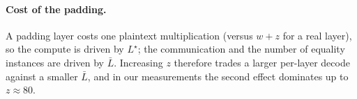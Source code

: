 \paragraph{Cost of the padding.}
A padding layer costs one plaintext multiplication (versus $w + z$ for a real
layer), so the compute is driven by $L^\star$; the communication and the number
of equality instances are driven by $\bar{L}$. Increasing $z$ therefore trades
a larger per-layer decode against a smaller $\bar{L}$, and in our measurements
the second effect dominates up to $z \approx 80$.
